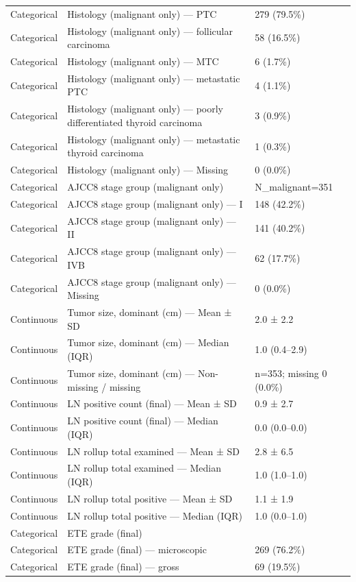\begin{table}[htbp]
\begin{tabular}{lll}
Categorical & Histology (malignant only) — PTC & 279 (79.5\%) \\
Categorical & Histology (malignant only) — follicular carcinoma & 58 (16.5\%) \\
Categorical & Histology (malignant only) — MTC & 6 (1.7\%) \\
Categorical & Histology (malignant only) — metastatic PTC & 4 (1.1\%) \\
Categorical & Histology (malignant only) — poorly differentiated thyroid carcinoma & 3 (0.9\%) \\
Categorical & Histology (malignant only) — metastatic thyroid carcinoma & 1 (0.3\%) \\
Categorical & Histology (malignant only) — Missing & 0 (0.0\%) \\
Categorical & AJCC8 stage group (malignant only) & N\_malignant=351 \\
Categorical & AJCC8 stage group (malignant only) — I & 148 (42.2\%) \\
Categorical & AJCC8 stage group (malignant only) — II & 141 (40.2\%) \\
Categorical & AJCC8 stage group (malignant only) — IVB & 62 (17.7\%) \\
Categorical & AJCC8 stage group (malignant only) — Missing & 0 (0.0\%) \\
Continuous & Tumor size, dominant (cm) — Mean ± SD & 2.0 ± 2.2 \\
Continuous & Tumor size, dominant (cm) — Median (IQR) & 1.0 (0.4–2.9) \\
Continuous & Tumor size, dominant (cm) — Non-missing / missing & n=353; missing 0 (0.0\%) \\
Continuous & LN positive count (final) — Mean ± SD & 0.9 ± 2.7 \\
Continuous & LN positive count (final) — Median (IQR) & 0.0 (0.0–0.0) \\
Continuous & LN rollup total examined — Mean ± SD & 2.8 ± 6.5 \\
Continuous & LN rollup total examined — Median (IQR) & 1.0 (1.0–1.0) \\
Continuous & LN rollup total positive — Mean ± SD & 1.1 ± 1.9 \\
Continuous & LN rollup total positive — Median (IQR) & 1.0 (0.0–1.0) \\
Categorical & ETE grade (final) &  \\
Categorical & ETE grade (final) — microscopic & 269 (76.2\%) \\
Categorical & ETE grade (final) — gross & 69 (19.5\%) \\

\end{tabular}
\end{table}
